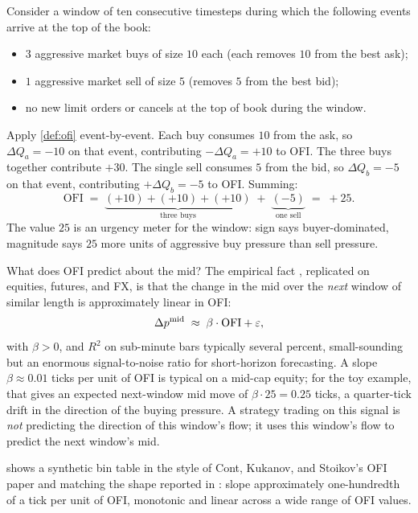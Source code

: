 Consider a window of ten consecutive timesteps during which the
following events arrive at the top of the book:
\begin{itemize}
  \item $3$ aggressive market buys of size $10$ each (each
  removes $10$ from the best ask);
  \item $1$ aggressive market sell of size $5$ (removes $5$ from
  the best bid);
  \item no new limit orders or cancels at the top of book during
  the window.
\end{itemize}
Apply \cref{def:ofi} event-by-event. Each buy consumes $10$ from
the ask, so $\Delta Q_a = -10$ on that event, contributing
$-\Delta Q_a = +10$ to OFI. The three buys together contribute
$+30$. The single sell consumes $5$ from the bid, so
$\Delta Q_b = -5$ on that event, contributing $+\Delta Q_b = -5$
to OFI. Summing:
\begin{equation}
  \mathrm{OFI}
  \;=\;
  \underbrace{(+10) + (+10) + (+10)}_{\text{three buys}}
  \;+\;
  \underbrace{(-5)}_{\text{one sell}}
  \;=\;
  +25.
\end{equation}
The value $25$ is an urgency meter for the window: sign says
buyer-dominated, magnitude says $25$ more units of aggressive
buy pressure than sell pressure.

What does OFI predict about the mid? The empirical fact
\citeBouchaud{}, replicated on equities, futures, and FX, is that
the change in the mid over the \emph{next} window of similar
length is approximately linear in OFI:
\begin{equation}
  \label{eq:ofi_regression}
  \Delta p^{\mathrm{mid}} \;\approx\; \beta \cdot \mathrm{OFI} + \varepsilon,
\end{equation}
with $\beta > 0$, and $R^2$ on sub-minute bars typically
several percent, small-sounding but an enormous
signal-to-noise ratio for short-horizon forecasting. A slope
$\beta \approx 0.01$ ticks per unit of OFI is typical on a
mid-cap equity; for the toy example, that gives an expected
next-window mid move of $\beta \cdot 25 = 0.25$ ticks, a
quarter-tick drift in the direction of the buying pressure. A
strategy trading on this signal is \emph{not} predicting the
direction of this window's flow; it uses this window's flow to
predict the next window's mid.

 shows a synthetic bin table in the style of
Cont, Kukanov, and Stoikov's OFI paper and matching the shape
reported in \citeBouchaud: slope approximately one-hundredth of a
tick per unit of OFI, monotonic and linear across a wide range
of OFI values.

